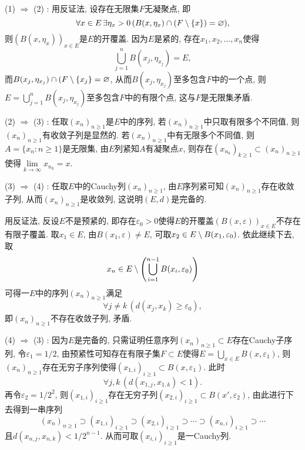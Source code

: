     \begin{Proof}
        (1) $ \Rightarrow $ (2) : 用反证法, 设存在无限集$ F $无凝聚点, 即
        \[
        \forall x\in E\,\exists\eta_x>0\,(B(x,\eta_x)\cap(F\setminus\{x\})=\varnothing),
        \]
        则$ (B(x,\eta_x))_{x\in E} $是$ E $的开覆盖. 因为$ E $是紧的, 存在$ x_1,x_2, \dots,x_n $使得
        \[
        \bigcup_{j=1}^nB(x_j,\eta_{x_j})=E,
        \]
        而$ B(x_j,\eta_{x_j})\cap(F\setminus\{x_j\}=\varnothing $, 从而$ B(x_j,\eta_{x_j}) $至多包含$ F $中的一个点, 则$ E=\bigcup_{j=1}^nB(x_j,\eta_{x_j}) $至多包含$ F $中的有限个点, 这与$ F $是无限集矛盾.

        (2) $ \Rightarrow $ (3) : 任取$ (x_n)_{n\geqslant 1} $是$ E $中的序列, 若$ (x_n)_{n\geqslant 1} $中只取有限多个不同值, 则$ (x_n)_{n\geqslant 1} $有收敛子列是显然的. 若$ (x_n)_{n\geqslant 1} $中有无限多个不同值, 则$ A=\{ x_n : n\geqslant 1 \} $是无限集, 由$ E $列紧知$ A $有凝聚点$ x $, 则存在$ (x_{n_k})_{k\geqslant 1}\subset(x_n)_{n\geqslant 1} $使得$ \lim\limits_{k\to\infty}x_{n_{k}}=x $.

        (3) $ \Rightarrow $ (4) : 任取$ E $中的Cauchy列$ (x_n)_{n\geqslant 1} $, 由$ E $序列紧可知$ (x_n)_{n\geqslant 1} $存在收敛子列, 从而$ (x_n)_{n\geqslant 1} $是收敛列, 这说明$ (E,d) $是完备的.

        用反证法, 反设$ E $不是预紧的, 即存在$ \varepsilon_0>0 $使得$ E $的开覆盖$ (B(x,\varepsilon))_{x\in E} $不存在有限子覆盖. 取$ x_1\in E $, 由$ B(x_1,\varepsilon)\ne E $, 可取$ x_2\in E\setminus B(x_1,\varepsilon_0) $. 依此继续下去, 取
        \[
        x_n\in E\setminus\left( \bigcup_{i=1}^{n-1}B(x_i,\varepsilon_0) \right)
        \]
        可得一$ E $中的序列$ (x_n)_{n\geqslant 1} $满足
        \[
        \forall j\ne k\,(d(x_j,x_k)\geqslant\varepsilon_0),
        \]
        即$ (x_n)_{n\geqslant 1} $不存在收敛子列, 矛盾.

        (4) $ \Rightarrow $ (3) : 因为$ E $是完备的, 只需证明任意序列$ (x_n)_{n\geqslant 1}\subset E $存在Cauchy子序列, 令$ \varepsilon_1=1/2 $, 由预紧性可知存在有限子集$ F\subset E $使得$ E=\bigcup_{x\in E}B(x,\varepsilon_1) $, 则$ (x_n)_{n\geqslant 1} $存在无穷子序列使得$ (x_{1,i})_{i\geqslant 1}\subset B(x,\varepsilon_1) $. 此时
        \[
        \forall j, k\,(d(x_{1,j},x_{1,k})<1).
        \]
        再令$ \varepsilon_2=1/2^2 $, 则$ (x_{1,i})_{i\geqslant 1} $存在无穷子列$ (x_{2,i})_{i\geqslant 1}\subset B(x',\varepsilon_2) $, 由此进行下去得到一串序列
        \[
        (x_n)_{n\geqslant 1}\supset(x_{1,i})_{i\geqslant 1}\supset(x_{2,i})_{i\geqslant 1}\supset\cdots\supset(x_{n,i})_{i\geqslant 1}\supset\cdots
        \]
        且$ d(x_{n,j},x_{n,k})<1/2^{n-1} $. 从而可取$ (x_{i,i})_{i\geqslant 1} $是一Cauchy列.


\end{Proof}
